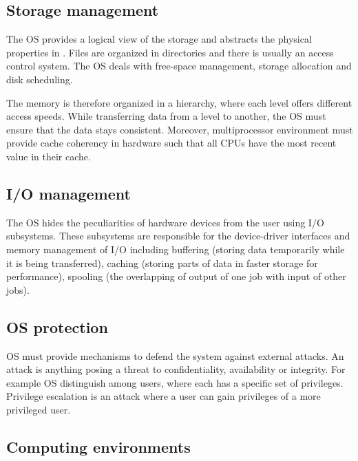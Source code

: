 \subsection{Storage management}

The OS provides a logical view of the storage and abstracts the physical properties in . Files are organized in directories and there is usually an access control system. The OS deals with free-space management, storage allocation and disk scheduling.

The memory is therefore organized in a hierarchy, where each level offers different access speeds. While transferring data from a level to another, the OS must ensure that the data stays consistent. Moreover, multiprocessor environment must provide cache coherency in hardware such that all CPUs have the most recent value in their cache.

\subsection{I/O management}

The OS hides the peculiarities of hardware devices from the user using I/O subsystems. These subsystems are responsible for the device-driver interfaces and memory management of I/O including buffering (storing data temporarily while it is being transferred), caching (storing parts of data in faster storage for performance), spooling (the overlapping of output of one job with input of other jobs).

\subsection{OS protection}

OS must provide mechanisms to defend the system against external attacks. An attack is anything posing a threat to confidentiality, availability or integrity. For example OS distinguish among users, where each has a specific set of privileges. Privilege escalation is an attack where a user can gain privileges of a more privileged user.

\subsection{Computing environments}

